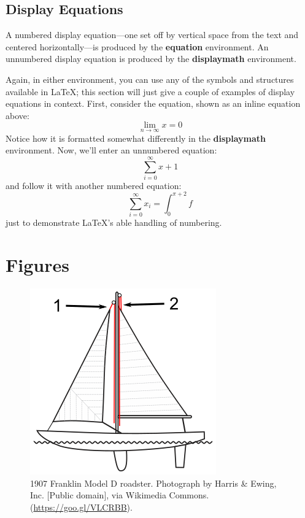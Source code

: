 \documentclass[sigconf]{acmart}
\begin{document}
\begin{itemize}
\subsection{Display Equations}
A numbered display equation---one set off by vertical space from the
text and centered horizontally---is produced by the \textbf{equation}
environment. An unnumbered display equation is produced by the
\textbf{displaymath} environment.

Again, in either environment, you can use any of the symbols and
structures available in \LaTeX\@; this section will just give a couple
of examples of display equations in context.  First, consider the
equation, shown as an inline equation above:
\begin{equation}
  \lim_{n\rightarrow \infty}x=0
\end{equation}
Notice how it is formatted somewhat differently in
the \textbf{displaymath}
environment.  Now, we'll enter an unnumbered equation:
\begin{displaymath}
  \sum_{i=0}^{\infty} x + 1
\end{displaymath}
and follow it with another numbered equation:
\begin{equation}
  \sum_{i=0}^{\infty}x_i=\int_{0}^{\pi+2} f
\end{equation}
just to demonstrate \LaTeX's able handling of numbering.

\section{Figures}

\begin{figure}[h]
  \centering
  \includegraphics[width=\linewidth]{img/Halyard}
  \caption{1907 Franklin Model D roadster. Photograph by Harris \&
    Ewing, Inc. [Public domain], via Wikimedia
    Commons. (\url{https://goo.gl/VLCRBB}).}
\end{figure}


\end{itemize}
\end{document}
